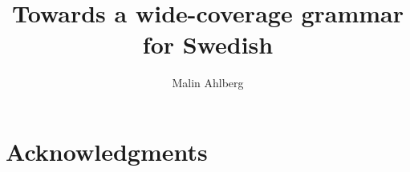 \documentclass{report}
\begin{document}
\title{Towards a wide-coverage grammar for Swedish} %
\author{Malin Ahlberg}
\maketitle
\newpage


\abstract{



}

\newpage

\section*{Acknowledgments}

\newpage
\end{document}
